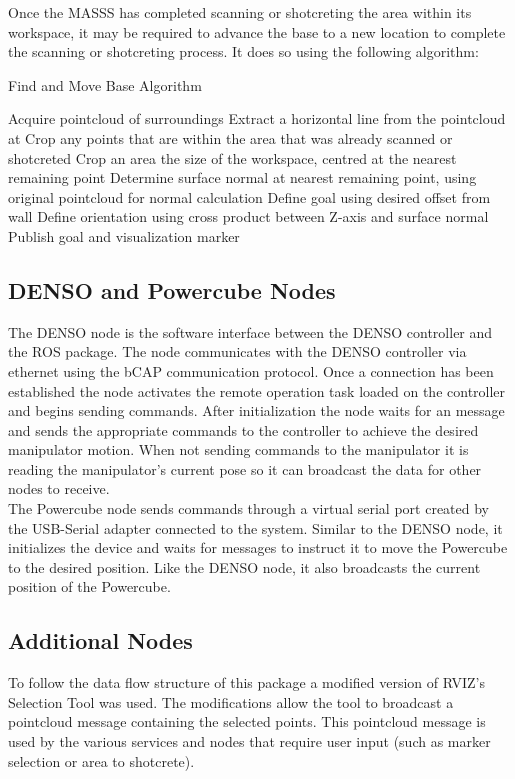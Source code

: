 Once the MASSS has completed scanning or shotcreting the area within its workspace, it may be required to advance the base to a new location to complete the scanning or shotcreting process. It does so using the following algorithm:

\begin{algorithm}[H]
\caption{Find and Move Base Algorithm}
\label{alg:findandmove}
\begin{algorithmic}[1]
\State Acquire pointcloud of surroundings
\State Extract a horizontal line from the pointcloud at 
\State Crop any points that are within the area that was already scanned or shotcreted
\State Crop an area the size of the workspace, centred at the nearest remaining point
\State Determine surface normal at nearest remaining point, using original pointcloud for normal calculation
\State Define  goal using desired offset from wall
\State Define  orientation using cross product between Z-axis and surface normal
\State Publish  goal and visualization marker
\end{algorithmic}
\end{algorithm}

\subsection{DENSO and Powercube Nodes}
The DENSO node is the software interface between the DENSO controller and the ROS package. The node communicates with the DENSO controller via ethernet using the bCAP communication protocol. Once a connection has been established the node activates the remote operation task loaded on the controller and begins sending commands. After initialization the node waits for an  message and sends the appropriate commands to the controller to achieve the desired manipulator motion. When not sending commands to the manipulator it is reading the manipulator's current pose so it can broadcast the data for other nodes to receive.\\

The Powercube node sends commands through a virtual serial port created by the USB-Serial adapter connected to the system. Similar to the DENSO node, it initializes the device and waits for  messages to instruct it to move the Powercube to the desired position. Like the DENSO node, it also broadcasts the current position of the Powercube.\\
 
\subsection{Additional Nodes}
To follow the data flow structure of this package a modified version of RVIZ's Selection Tool was used. The modifications allow the tool to broadcast a pointcloud message containing the selected points. This pointcloud message is used by the various services and nodes that require user input (such as marker selection or area to shotcrete).\\

